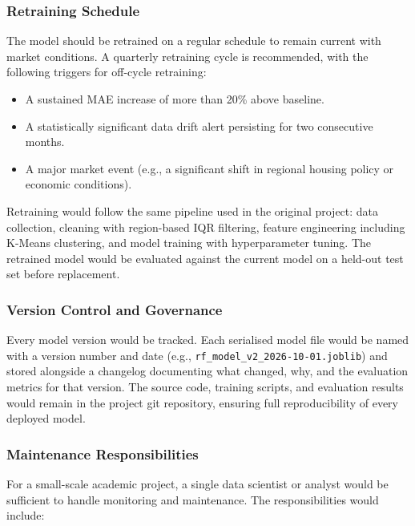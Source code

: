 \subsubsection{Retraining Schedule}

\noindent
The model should be retrained on a regular schedule to remain current with market conditions. A quarterly retraining cycle is recommended, with the following triggers for off-cycle retraining:

\begin{itemize}
    \item A sustained MAE increase of more than 20\% above baseline.
    \item A statistically significant data drift alert persisting for two consecutive months.
    \item A major market event (e.g., a significant shift in regional housing policy or economic conditions).
\end{itemize}

\noindent
Retraining would follow the same pipeline used in the original project: data collection, cleaning with region-based IQR filtering, feature engineering including K-Means clustering, and model training with hyperparameter tuning. The retrained model would be evaluated against the current model on a held-out test set before replacement.

\subsubsection{Version Control and Governance}

\noindent
Every model version would be tracked. Each serialised model file would be named with a version number and date (e.g., \texttt{rf\_model\_v2\_2026-10-01.joblib}) and stored alongside a changelog documenting what changed, why, and the evaluation metrics for that version. The source code, training scripts, and evaluation results would remain in the project git repository, ensuring full reproducibility of every deployed model.

\subsubsection{Maintenance Responsibilities}

\noindent
For a small-scale academic project, a single data scientist or analyst would be sufficient to handle monitoring and maintenance. The responsibilities would include:

